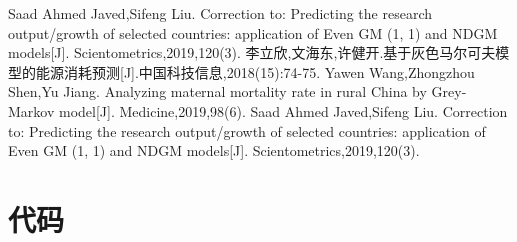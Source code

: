 \documentclass{whutmod}
\begin{document}
 
	\newpage	%
	\nocite{*}		%
%
%	
\begin{thebibliography}{9}%
	Saad Ahmed Javed,Sifeng Liu. Correction to: Predicting the research output/growth of selected countries: application of Even GM (1, 1) and NDGM models[J]. Scientometrics,2019,120(3).
	李立欣,文海东,许健开.基于灰色马尔可夫模型的能源消耗预测[J].中国科技信息,2018(15):74-75.	
	Yawen Wang,Zhongzhou Shen,Yu Jiang. Analyzing maternal mortality rate in rural China by Grey-Markov model[J]. Medicine,2019,98(6).
	Saad Ahmed Javed,Sifeng Liu. Correction to: Predicting the research output/growth of selected countries: application of Even GM (1, 1) and NDGM models[J]. Scientometrics,2019,120(3).

\end{thebibliography}

	\newpage
	\appendix %

\section{代码}
\end{document}
